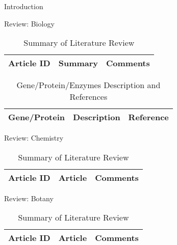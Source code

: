\begin{frame}[t]
\begin{columns}[t]
\begin{column}{\onecolwid}
\begin{alertblock}{Introduction}
\end{alertblock}
\begin{alertblock}{Review: Biology}

\begin{table}[H]
	\centering
	\begin{tabular}{r|p{12cm}|l}
	\hline
	Article ID  & Summary & Comments \\
	\hline
	\hline
	\end{tabular}
	\caption{Summary of Literature Review}
\end{table}		

\centering	
\begin{table}[H]\tiny
\caption{Gene/Protein/Enzymes Description and References}	
	\begin{tabular}{r|p{4cm}|l}
	\hline	
	Gene/Protein & Description & Reference \\
	\hline
	\hline 
	\end{tabular}
\end{table}

\end{alertblock}
\begin{alertblock}{Review: Chemistry}

\begin{table}[H]
	\centering
	\begin{tabular}{r|p{12cm}|l}
	\hline
	Article ID  & Article & Comments \\
	\hline
	\hline
	\end{tabular}
	\caption{Summary of Literature Review}
\end{table} 


\end{alertblock}
\begin{alertblock}{Review: Botany}

\begin{table}[H]
	\centering
	\begin{tabular}{r|p{12cm}|l}
	\hline
	Article ID  & Article & Comments \\
	\hline
	\hline
	\end{tabular}
	\caption{Summary of Literature Review}
\end{table} 



\end{alertblock}
\end{column}
\end{columns}
\end{frame}
